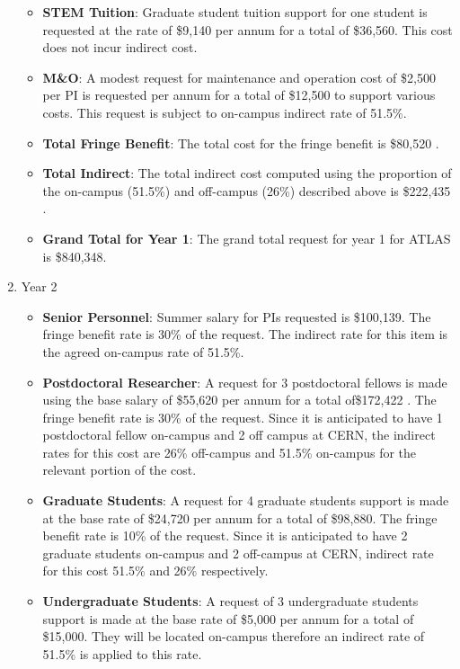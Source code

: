 \begin{enumerate}
\begin{itemize}
\item {{\bf STEM Tuition}: Graduate student tuition support for one student is requested at the rate of \$9,140 per annum for a total of \$36,560.  This cost does not incur indirect cost.}

\item {{\bf M\&O}: A modest request for maintenance and operation cost of \$2,500 per PI is requested per annum for a total of \$12,500 to support various costs. This request is subject to on-campus indirect rate of 51.5\%.}

\item {{\bf Total Fringe Benefit}: The total cost for the fringe benefit is \$80,520 .}

\item {{\bf Total Indirect}: The total indirect cost computed using the proportion of the on-campus (51.5\%) and off-campus (26\%) described above is \$222,435 .}

\item {{\bf Grand Total for Year 1}: The grand total request for year 1 for ATLAS is \$840,348.}

\end{itemize}

\item{Year 2}
\begin{itemize}
\item{{\bf Senior Personnel}: Summer salary for PIs requested is \$100,139.   The fringe benefit rate is 30\% of the request.  The indirect rate for this item is the agreed on-campus rate of 51.5\%.}

\item {{\bf Postdoctoral Researcher}:  A request for 3 postdoctoral fellows is made using the base salary of \$55,620 per annum for a total of\$172,422 .  The fringe benefit rate is 30\% of the request.  Since it is anticipated to have 1 postdoctoral fellow on-campus and 2 off campus at CERN, the indirect rates for this cost are 26\% off-campus and 51.5\% on-campus for the relevant portion of the cost.} 

\item{{\bf Graduate Students}: A request for 4 graduate students support is made at the base rate of \$24,720 per annum for a total of \$98,880.   The fringe benefit rate is 10\% of the request.  Since it is anticipated to have 2 graduate students on-campus and 2 off-campus at CERN, indirect rate for this cost 51.5\% and 26\% respectively.}

\item {{\bf Undergraduate Students}: A request of 3 undergraduate students support is made at the base rate of \$5,000 per annum for a total of \$15,000. They will be located on-campus therefore an indirect rate of 51.5\% is applied to this rate. }


\end{itemize}
\end{enumerate}
